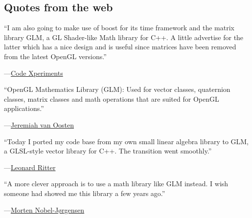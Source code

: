 \documentclass{scrartcl}
\numberwithin{figure}{subsection}
\begin{document}
\subsection{Quotes from the web}

\enquote{I am also going to make use of boost for its time framework and the matrix library GLM, a GL Shader-like Math library for C++. A little advertise for the latter which has a nice design and is useful since matrices have been removed from the latest OpenGL versions.}
\begin{flushright}
---\href{http://www.codexperiments.com/android/2010/10/android-sdk-ndk-part-4-the-silver-bullet-of-android/}{Code Xperiments}
\end{flushright}

\enquote{OpenGL Mathematics Library (GLM): Used for vector classes, quaternion classes, matrix classes and math operations that are suited for OpenGL applications.}
\begin{flushright}
---\href{http://3dgep.com/?p=1116}{Jeremiah van Oosten}
\end{flushright}

\enquote{Today I ported my code base from my own small linear algebra library to GLM, a GLSL-style vector library for C++. The transition went smoothly.}
\begin{flushright}
---\href{http://devel.leonard-ritter.com/2011/08/planning-sparse-voxel-octrees.html}{Leonard Ritter}
\end{flushright}

\enquote{A more clever approach is to use a math library like GLM instead. I wish someone had showed me this library a few years ago.}
\begin{flushright}
---\href{http://blog.nobel-joergensen.com/2011/04/02/glm-brilliant-math-library-for-opengl/}{Morten Nobel-Jørgensen}
\end{flushright}
\end{document}
